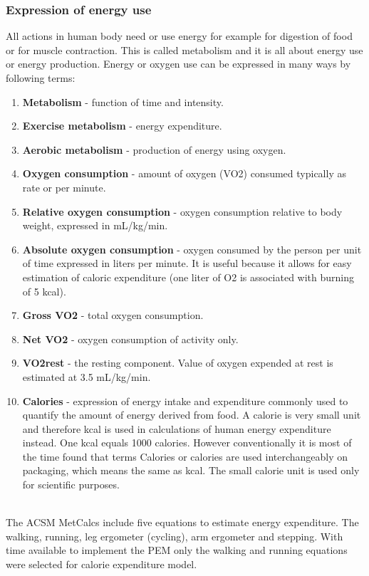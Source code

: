 \documentclass[12pt, a4paper]{report}   %
\begin{document}
\begin{enumerate}
\subsubsection{Expression of energy use}
All actions in human body need or use energy for example for digestion of food or for muscle contraction. This is called metabolism and it is all about energy use or energy production. Energy or oxygen use can be expressed in many ways by following terms:\\
\begin{enumerate}
	\item \textbf{Metabolism} - function of time and intensity.
	\item \textbf{Exercise metabolism} - energy expenditure.
	\item \textbf{Aerobic metabolism} - production of energy using oxygen.
	\item \textbf{Oxygen consumption} - amount of oxygen (VO2) consumed typically as rate or per minute.
	\item \textbf{Relative oxygen consumption} - oxygen consumption relative to body weight, expressed in mL/kg/min.
	\item \textbf{Absolute oxygen consumption} - oxygen consumed by the person per unit of time expressed in liters per minute. It is useful because it allows for easy estimation of caloric expenditure (one liter of O2 is associated with burning of 5 kcal).
	\item \textbf{Gross VO2} - total oxygen consumption.
	\item \textbf{Net VO2} - oxygen consumption of activity only.
	\item \textbf{VO2rest} - the resting component. Value of oxygen expended at rest is estimated at 3.5 mL/kg/min.
\item \textbf{Calories} - expression of energy intake and expenditure commonly used to quantify the amount of energy derived from food. A calorie is very small unit and therefore kcal is used in calculations of human energy expenditure instead. One kcal equals 1000 calories. However conventionally it is most of the time found that terms Calories or calories are used interchangeably on packaging, which means the same as kcal. The small calorie unit is used only for scientific purposes.\\ \\
\end{enumerate}


The ACSM MetCalcs include five equations to estimate energy expenditure. The walking, running, leg ergometer (cycling), arm ergometer and stepping. With time available to implement the PEM only the walking and running equations were selected for calorie expenditure model.\\ \\


\end{enumerate}
\end{document}
